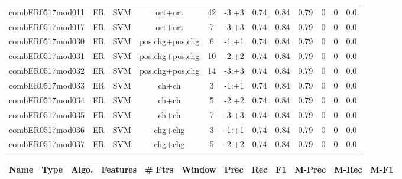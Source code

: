 \documentclass[a4paper]{article}
\begin{document}
\begin{landscape}
\begin{center}
\begin{tabular}{ |c|c|c|c|c|c|c|c|c|c|c|c|}
 
 	
 	\small{ combER0517mod011 } & ER & SVM & ort+ort  &  42 &  -3:+3  &  0.74 & 0.84 & 0.79  &  0 & 0 & 0.0 \\
 	

 
 	
 	\small{ combER0517mod017 } & ER & SVM & ort+ort  &  7 &  -3:+3  &  0.74 & 0.84 & 0.79  &  0 & 0 & 0.0 \\
 	

 
 	
 	\small{ combER0517mod030 } & ER & SVM & pos,chg+pos,chg  &  6 &  -1:+1  &  0.74 & 0.84 & 0.79  &  0 & 0 & 0.0 \\
 	

 
 	
 	\small{ combER0517mod031 } & ER & SVM & pos,chg+pos,chg  &  10 &  -2:+2  &  0.74 & 0.84 & 0.79  &  0 & 0 & 0.0 \\
 	

 
 	
 	\small{ combER0517mod032 } & ER & SVM & pos,chg+pos,chg  &  14 &  -3:+3  &  0.74 & 0.84 & 0.79  &  0 & 0 & 0.0 \\
 	

 
 	
 	\small{ combER0517mod033 } & ER & SVM & ch+ch  &  3 &  -1:+1  &  0.74 & 0.84 & 0.79  &  0 & 0 & 0.0 \\
 	

 
 	
 	\small{ combER0517mod034 } & ER & SVM & ch+ch  &  5 &  -2:+2  &  0.74 & 0.84 & 0.79  &  0 & 0 & 0.0 \\
 	

 
 	
 	\small{ combER0517mod035 } & ER & SVM & ch+ch  &  7 &  -3:+3  &  0.74 & 0.84 & 0.79  &  0 & 0 & 0.0 \\
 	

 
 	
 	\small{ combER0517mod036 } & ER & SVM & chg+chg  &  3 &  -1:+1  &  0.74 & 0.84 & 0.79  &  0 & 0 & 0.0 \\
 	

 
 	
 	\small{ combER0517mod037 } & ER & SVM & chg+chg  &  5 &  -2:+2  &  0.74 & 0.84 & 0.79  &  0 & 0 & 0.0 \\
 	
 \hline
\end{tabular}
\end{center}




\begin{center}
\begin{tabular}{ |c|c|c|c|c|c|c|c|c|c|c|c|} 
 \hline
 	Name & Type & Algo. & Features & \# Ftrs & Window & Prec & Rec & F1 & M-Prec & M-Rec & M-F1\\
 \hline


\end{tabular}
\end{center}
\end{landscape}
\end{document}
